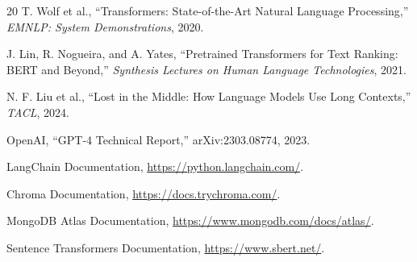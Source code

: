\documentclass[11pt]{article}
\begin{document}
\begin{thebibliography}{20}
T. Wolf et al., ``Transformers: State-of-the-Art Natural Language Processing,'' \emph{EMNLP: System Demonstrations}, 2020.

J. Lin, R. Nogueira, and A. Yates, ``Pretrained Transformers for Text Ranking: BERT and Beyond,'' \emph{Synthesis Lectures on Human Language Technologies}, 2021.

N. F. Liu et al., ``Lost in the Middle: How Language Models Use Long Contexts,'' \emph{TACL}, 2024.

OpenAI, ``GPT-4 Technical Report,'' arXiv:2303.08774, 2023.

LangChain Documentation, \url{https://python.langchain.com/}.

Chroma Documentation, \url{https://docs.trychroma.com/}.

MongoDB Atlas Documentation, \url{https://www.mongodb.com/docs/atlas/}.

Sentence Transformers Documentation, \url{https://www.sbert.net/}.
\end{thebibliography}
\end{document}
